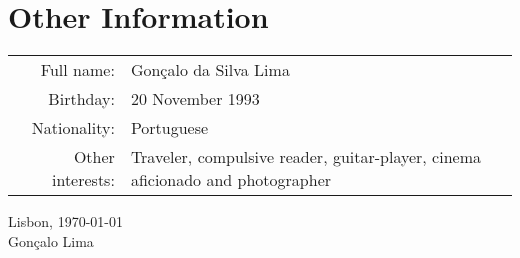 \documentclass[a4paper,11pt]{article} %
\begin{document}


\section[Other Information]{\faInfoCircle \hspace{3pt} Other Information}

\begin{tabular}{rp{13cm}}
 Full name: & Gonçalo da Silva Lima \\
 Birthday: & 20 November 1993 \\
 Nationality: & Portuguese	\\
 Other interests:	& Traveler, compulsive reader, guitar-player, cinema aficionado and photographer \\
\end{tabular}

\vspace{2cm}
\begin{flushright}
\normalsize Lisbon, \today \\
\normalsize Gonçalo Lima \\
\end{flushright}

\end{document}
